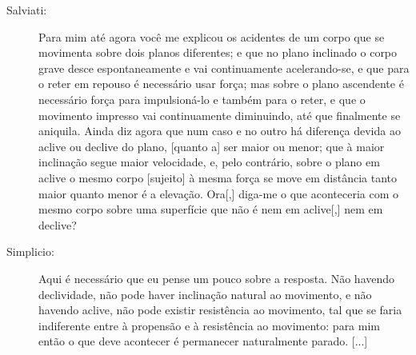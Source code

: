 \begin{description}
\item[Salviati:] Para mim até agora você me explicou os acidentes de um corpo que se movimenta sobre dois planos diferentes; e que no plano inclinado o corpo grave desce espontaneamente e vai continuamente acelerando-se, e que para o reter em repouso é necessário usar força; mas sobre o plano ascendente é necessário força para impulsioná-lo e também para o reter, e que o movimento impresso vai continuamente diminuindo, até que finalmente se aniquila. Ainda diz agora que num caso e no outro há diferença devida ao aclive ou declive do plano, [quanto a] ser maior ou menor; que à maior inclinação segue maior velocidade, e, pelo contrário, sobre o plano em aclive o mesmo corpo [sujeito] à mesma força se move em distância tanto maior quanto menor é a elevação. Ora[,] diga-me o que aconteceria com o mesmo corpo sobre uma superfície que não é nem em aclive[,] nem em declive?

\item[Simplicio:] Aqui é necessário que eu pense um pouco sobre a resposta. Não havendo declividade, não pode haver inclinação natural ao movimento, e não havendo aclive, não pode existir resistência ao movimento, tal que se faria indiferente entre à propensão e à resistência ao movimento: para mim então o que deve acontecer é permanecer naturalmente parado. [...]


\end{description}

